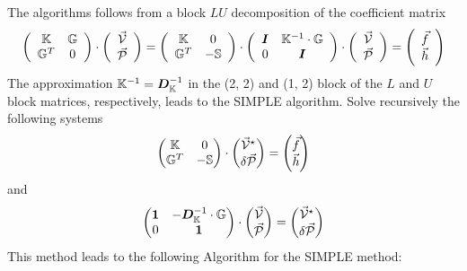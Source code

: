 The algorithms follows from a block $LU$ decomposition of the coefficient matrix
\begin{equation}
\left(\begin{array}{cc}
{\mathbb{K}} & {\mathbb{G}} \\ {\mathbb{G}}^T & 0  
\end{array}\right)
\cdot
\left(\begin{array}{c}
\vec{\cal V} \\ \vec{\cal P}
\end{array}\right)
=
\left(\begin{array}{cc}
{\mathbb{K}} & 0 \\ {\mathbb{G}}^T & -{\mathbb{S}}
\end{array}\right)
\cdot
\left(\begin{array}{cc}
{\bm I} & {\mathbb{K}}^{-1} \cdot {\mathbb{G}} \\
0 & {\bm I} 
\end{array}\right)
\cdot
\left(\begin{array}{c}
\vec{\cal V} \\ \vec{\cal P}
\end{array}\right)
=
\left(\begin{array}{c}
\vec{f} \\ \vec{h}
\end{array}\right)
\end{equation}
The approximation ${\mathbb{K}}^{-1}={\bm D}_{\mathbb{K}}^{-1}$ in the (2, 2) and (1, 2) block of the
$L$ and $U$ block matrices, respectively, leads to the SIMPLE algorithm. Solve recursively the
following systems
\[
\begin{pmatrix}
{\mathbb{K}} & 0 \\
{\mathbb{G}}^T & -{\mathbb{S}}
\end{pmatrix}
\cdot
\begin{pmatrix}
\vec{\cal V}^\star \\
\delta \vec{\cal P}
\end{pmatrix}
=
\begin{pmatrix}
\vec{f} \\
\vec{h}
\end{pmatrix}
\]
and
\[
\begin{pmatrix}
{\bm 1} & -{\bm D}_{\mathbb{K}}^{-1} \cdot {\mathbb{G}} \\
0 & {\bm 1}
\end{pmatrix}
\cdot
\begin{pmatrix}
\vec{\cal V} \\
\vec{\cal P}
\end{pmatrix}
=
\begin{pmatrix}
\vec{\cal V}^\star \\
\delta \vec{\cal P}
\end{pmatrix}
\]
This method leads to the following Algorithm for the SIMPLE method:

